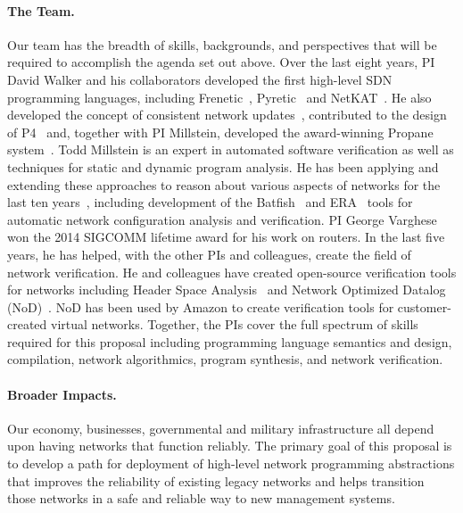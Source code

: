 \paragraph{The Team.}  Our team has the breadth of skills, backgrounds, and perspectives that will be required to accomplish the agenda set out above.  
Over the last eight years, PI David Walker and his collaborators
developed the first high-level SDN programming languages, including
Frenetic~\cite{frenetic}, Pyretic~\cite{pyretic} and NetKAT~\cite{netkat}.
He also developed the concept of consistent network updates~\cite{reitblatt+:consistent-updates},
 contributed to the design of P4~\cite{P4} and, together with PI Millstein, 
developed the award-winning
Propane system~\cite{beckett+:propane}.   Todd Millstein is an expert in automated software verification as well as techniques for static and dynamic program analysis.  He has been applying and extending these approaches to reason about various aspects of networks for the last ten years~\cite{DBLP:conf/pldi/KothariGMG07,gullible,DBLP:conf/sigcomm/KothariMMGM11,DBLP:conf/nsdi/PedrosaFKGMM15}, including development of the Batfish~\cite{batfish} and ERA~\cite{era} tools for automatic network configuration analysis and verification. PI George Varghese won the 2014 SIGCOMM lifetime award for his work on routers.  In the last five years, he has helped, with the other PIs and colleagues, create the field of network verification.  He and colleagues have created open-source verification tools for networks including Header Space Analysis~\cite{hsa} and Network Optimized Datalog (NoD)~\cite{nod}. NoD has been used by Amazon to create verification tools for customer-created virtual networks.  Together, the PIs cover the full spectrum of skills required for this proposal including programming
language semantics and design,
compilation,
network algorithmics,
program synthesis, and
network verification.

\paragraph{Broader Impacts.}  
Our economy, businesses, governmental and military infrastructure all depend upon having networks that function
reliably.  
The primary goal of this proposal is to develop
a path for deployment of high-level network programming abstractions that
improves the reliability of existing legacy networks and helps
transition those networks in a safe and reliable way to new management systems.

